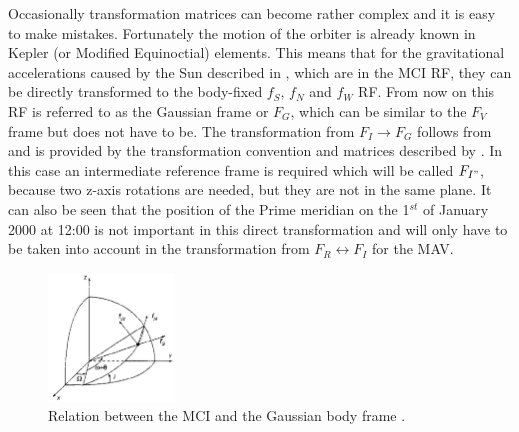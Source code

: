 Occasionally transformation matrices can become rather complex and it is easy to make mistakes. Fortunately the motion of the orbiter is already known in Kepler (or Modified Equinoctial) elements. This means that for the gravitational accelerations caused by the Sun described in , which are in the \ac{MCI} \ac{RF}, they can be directly transformed to the body-fixed $f_{S}$, $f_{N}$ and $f_{W}$ \ac{RF}. From now on this \ac{RF} is referred to as the Gaussian frame or $F_{G}$, which can be similar to the $F_{V}$ frame but does not have to be. The transformation from $F_{I} \rightarrow F_{G}$ follows from  and is provided by the transformation convention and matrices described by . In this case an intermediate reference frame is required which will be called $F_{I"}$, because two z-axis rotations are needed, but they are not in the same plane. It can also be seen that the position of the Prime meridian  on the 1$^{st}$ of January 2000 at 12:00 is not important in this direct transformation and will only have to be taken into account in the transformation from $F_{R} \leftrightarrow F_{I}$ for the \ac{MAV}.



\begin{figure}[!ht]
\centering
\includegraphics[width=0.3\textwidth]{figures/transfer_orbits/sc_acc_wakker2010.jpg}
\caption{Relation between the \ac{MCI} and the Gaussian body frame \cite{wakker2010}.}
\label{fig:sc_acc_wakker2010_repeat}
\end{figure}





